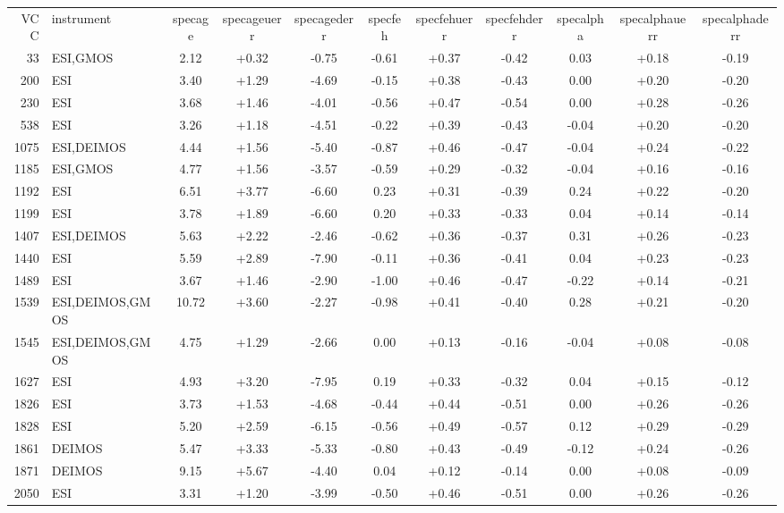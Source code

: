 \begin{tabular}{rlccccccccc}
VCC & instrument & specage & specageuerr & specagederr & specfeh & specfehuerr & specfehderr & specalpha & specalphauerr & specalphaderr\\    
33 & ESI,GMOS &  2.12 & +0.32  & -0.75   &  -0.61 & +0.37  & -0.42  &  0.03 & +0.18  & -0.19   \\
200 & ESI &  3.40 & +1.29  & -4.69   &  -0.15 & +0.38  & -0.43  &  0.00 & +0.20  & -0.20   \\
230 & ESI &  3.68 & +1.46  & -4.01   &  -0.56 & +0.47  & -0.54  &  0.00 & +0.28  & -0.26   \\
538 & ESI &  3.26 & +1.18  & -4.51   &  -0.22 & +0.39  & -0.43  &  -0.04 & +0.20  & -0.20   \\
1075 & ESI,DEIMOS &  4.44 & +1.56  & -5.40   &  -0.87 & +0.46  & -0.47  &  -0.04 & +0.24  & -0.22   \\
1185 & ESI,GMOS &  4.77 & +1.56  & -3.57   &  -0.59 & +0.29  & -0.32  &  -0.04 & +0.16  & -0.16   \\
1192 & ESI &  6.51 & +3.77  & -6.60   &  0.23 & +0.31  & -0.39  &  0.24 & +0.22  & -0.20   \\
1199 & ESI &  3.78 & +1.89  & -6.60   &  0.20 & +0.33  & -0.33  &  0.04 & +0.14  & -0.14   \\
1407 & ESI,DEIMOS &  5.63 & +2.22  & -2.46   &  -0.62 & +0.36  & -0.37  &  0.31 & +0.26  & -0.23   \\
1440 & ESI &  5.59 & +2.89  & -7.90   &  -0.11 & +0.36  & -0.41  &  0.04 & +0.23  & -0.23   \\
1489 & ESI &  3.67 & +1.46  & -2.90   &  -1.00 & +0.46  & -0.47  &  -0.22 & +0.14  & -0.21   \\
1539 & ESI,DEIMOS,GMOS &  10.72 & +3.60  & -2.27   &  -0.98 & +0.41  & -0.40  &  0.28 & +0.21  & -0.20   \\
1545 & ESI,DEIMOS,GMOS &  4.75 & +1.29  & -2.66   &  0.00 & +0.13  & -0.16  &  -0.04 & +0.08  & -0.08   \\
1627 & ESI &  4.93 & +3.20  & -7.95   &  0.19 & +0.33  & -0.32  &  0.04 & +0.15  & -0.12   \\
1826 & ESI &  3.73 & +1.53  & -4.68   &  -0.44 & +0.44  & -0.51  &  0.00 & +0.26  & -0.26   \\
1828 & ESI &  5.20 & +2.59  & -6.15   &  -0.56 & +0.49  & -0.57  &  0.12 & +0.29  & -0.29   \\
1861 & DEIMOS &  5.47 & +3.33  & -5.33   &  -0.80 & +0.43  & -0.49  &  -0.12 & +0.24  & -0.26   \\
1871 & DEIMOS &  9.15 & +5.67  & -4.40   &  0.04 & +0.12  & -0.14  &  0.00 & +0.08  & -0.09   \\
2050 & ESI &  3.31 & +1.20  & -3.99   &  -0.50 & +0.46  & -0.51  &  0.00 & +0.26  & -0.26   \\
\end{tabular}
